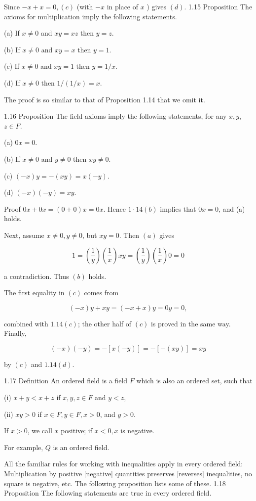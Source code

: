 \documentclass[10pt]{article}
\begin{document}
Since $-x+x=0,(c)$ (with $-x$ in place of $x$ ) gives $(d)$. 1.15 Proposition The axioms for multiplication imply the following statements.

(a) If $x \neq 0$ and $x y=x z$ then $y=z$.

(b) If $x \neq 0$ and $x y=x$ then $y=1$.

(c) If $x \neq 0$ and $x y=1$ then $y=1 / x$.

(d) If $x \neq 0$ then $1 /(1 / x)=x$.

The proof is so similar to that of Proposition 1.14 that we omit it.

1.16 Proposition The field axioms imply the following statements, for any $x, y$, $z \in F$.

(a) $0 x=0$.

(b) If $x \neq 0$ and $y \neq 0$ then $x y \neq 0$.

(c) $(-x) y=-(x y)=x(-y)$.

(d) $(-x)(-y)=x y$.

Proof $0 x+0 x=(0+0) x=0 x$. Hence $1 \cdot 14(b)$ implies that $0 x=0$, and (a) holds.

Next, assume $x \neq 0, y \neq 0$, but $x y=0$. Then $(a)$ gives

$$
1=\left(\frac{1}{y}\right)\left(\frac{1}{x}\right) x y=\left(\frac{1}{y}\right)\left(\frac{1}{x}\right) 0=0
$$

a contradiction. Thus $(b)$ holds.

The first equality in $(c)$ comes from

$$
(-x) y+x y=(-x+x) y=0 y=0,
$$

combined with $1.14(c)$; the other half of $(c)$ is proved in the same way. Finally,

$$
(-x)(-y)=-[x(-y)]=-[-(x y)]=x y
$$

by $(c)$ and $1.14(d)$.

1.17 Definition An ordered field is a field $F$ which is also an ordered set, such that

(i) $x+y<x+z$ if $x, y, z \in F$ and $y<z$,

(ii) $x y>0$ if $x \in F, y \in F, x>0$, and $y>0$.

If $x>0$, we call $x$ positive; if $x<0, x$ is negative.

For example, $Q$ is an ordered field.

All the familiar rules for working with inequalities apply in every ordered field: Multiplication by positive [negative] quantities preserves [reverses] inequalities, no square is negative, etc. The following proposition lists some of these. 1.18 Proposition The following statements are true in every ordered field.
\end{document}
